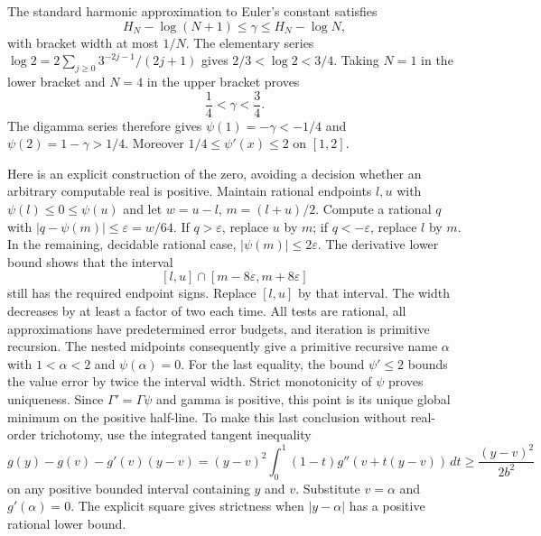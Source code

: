 The standard harmonic approximation to Euler's constant satisfies
\[
 H_N-\log(N+1)\le\gamma\le H_N-\log N,
\]
with bracket width at most $1/N$.  The elementary series
$\log2=2\sum_{j\ge0}3^{-2j-1}/(2j+1)$ gives
$2/3<\log2<3/4$.  Taking $N=1$ in the lower bracket and $N=4$ in the
upper bracket proves
\[
 \frac14<\gamma<\frac34.
\]
The digamma series therefore gives
$\psi(1)=-\gamma<-1/4$ and $\psi(2)=1-\gamma>1/4$.
Moreover $1/4\le\psi'(x)\le2$ on $[1,2]$.

Here is an explicit construction of the zero, avoiding a decision whether
an arbitrary computable real is positive.  Maintain rational endpoints
$l,u$ with $\psi(l)\le0\le\psi(u)$ and let $w=u-l$, $m=(l+u)/2$.
Compute a rational $q$ with $|q-\psi(m)|\le\varepsilon=w/64$.
If $q>\varepsilon$, replace $u$ by $m$; if $q<-\varepsilon$, replace $l$
by $m$.  In the remaining, decidable rational case, $|\psi(m)|\le2\varepsilon$.
The derivative lower bound shows that the interval
\[
 [l,u]\cap[m-8\varepsilon,m+8\varepsilon]
\]
still has the required endpoint signs.  Replace $[l,u]$ by that interval.
The width decreases by at least a factor of two each time.  All tests
are rational, all approximations have predetermined error budgets, and
iteration is primitive recursion.  The nested midpoints consequently give
a primitive recursive name $\alpha$ with $1<\alpha<2$ and $\psi(\alpha)=0$.
For the last equality, the bound $\psi'\le2$ bounds the value error by
twice the interval width.  Strict monotonicity of $\psi$ proves uniqueness.
Since $\Gamma'=\Gamma\psi$ and gamma is positive, this point is its unique
global minimum on the positive half-line.  To make this last conclusion
without real-order trichotomy, use the integrated tangent inequality
\[
 g(y)-g(v)-g'(v)(y-v)
 =(y-v)^2\int_0^1(1-t)g''(v+t(y-v))\,dt
 \ge\frac{(y-v)^2}{2b^2}
\]
on any positive bounded interval containing $y$ and $v$.  Substitute
$v=\alpha$ and $g'(\alpha)=0$.  The explicit square gives strictness when
$|y-\alpha|$ has a positive rational lower bound.

